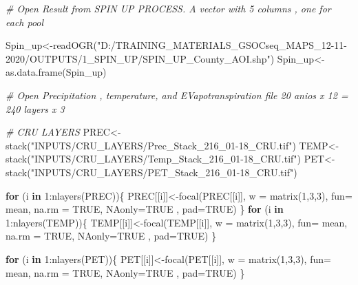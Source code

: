 \documentclass[
  10pt,
  b5paper,
]{book}
\newenvironment{Shaded}{\begin{snugshade}}{\end{snugshade}}
\newcommand{\AttributeTok}[1]{\textcolor[rgb]{0.77,0.63,0.00}{#1}}
\newcommand{\CommentTok}[1]{\textcolor[rgb]{0.56,0.35,0.01}{\textit{#1}}}
\newcommand{\ConstantTok}[1]{\textcolor[rgb]{0.00,0.00,0.00}{#1}}
\newcommand{\ControlFlowTok}[1]{\textcolor[rgb]{0.13,0.29,0.53}{\textbf{#1}}}
\newcommand{\DecValTok}[1]{\textcolor[rgb]{0.00,0.00,0.81}{#1}}
\newcommand{\FunctionTok}[1]{\textcolor[rgb]{0.00,0.00,0.00}{#1}}
\newcommand{\NormalTok}[1]{#1}
\newcommand{\OtherTok}[1]{\textcolor[rgb]{0.56,0.35,0.01}{#1}}
\newcommand{\SpecialCharTok}[1]{\textcolor[rgb]{0.00,0.00,0.00}{#1}}
\newcommand{\StringTok}[1]{\textcolor[rgb]{0.31,0.60,0.02}{#1}}
\begin{document}
\begin{Shaded}
\begin{Highlighting}[]
\CommentTok{\# Open Result from SPIN UP PROCESS. A vector with 5 columns , one for each pool}

\NormalTok{Spin\_up}\OtherTok{\textless{}{-}}\FunctionTok{readOGR}\NormalTok{(}\StringTok{"D:/TRAINING\_MATERIALS\_GSOCseq\_MAPS\_12{-}11{-}2020/OUTPUTS/1\_SPIN\_UP/SPIN\_UP\_County\_AOI.shp"}\NormalTok{)}
\NormalTok{Spin\_up}\OtherTok{\textless{}{-}}\FunctionTok{as.data.frame}\NormalTok{(Spin\_up)}

\CommentTok{\# Open Precipitation , temperature, and EVapotranspiration file 20 anios x 12 = 240 layers x 3}

\CommentTok{\# CRU LAYERS}
\NormalTok{PREC}\OtherTok{\textless{}{-}}\FunctionTok{stack}\NormalTok{(}\StringTok{"INPUTS/CRU\_LAYERS/Prec\_Stack\_216\_01{-}18\_CRU.tif"}\NormalTok{)}
\NormalTok{TEMP}\OtherTok{\textless{}{-}}\FunctionTok{stack}\NormalTok{(}\StringTok{"INPUTS/CRU\_LAYERS/Temp\_Stack\_216\_01{-}18\_CRU.tif"}\NormalTok{)}
\NormalTok{PET}\OtherTok{\textless{}{-}}\FunctionTok{stack}\NormalTok{(}\StringTok{"INPUTS/CRU\_LAYERS/PET\_Stack\_216\_01{-}18\_CRU.tif"}\NormalTok{)}

\ControlFlowTok{for}\NormalTok{ (i }\ControlFlowTok{in} \DecValTok{1}\SpecialCharTok{:}\FunctionTok{nlayers}\NormalTok{(PREC))\{}
\NormalTok{  PREC[[i]]}\OtherTok{\textless{}{-}}\FunctionTok{focal}\NormalTok{(PREC[[i]], }\AttributeTok{w =} \FunctionTok{matrix}\NormalTok{(}\DecValTok{1}\NormalTok{,}\DecValTok{3}\NormalTok{,}\DecValTok{3}\NormalTok{), }\AttributeTok{fun=}\NormalTok{ mean,  }\AttributeTok{na.rm =} \ConstantTok{TRUE}\NormalTok{, }\AttributeTok{NAonly=}\ConstantTok{TRUE}\NormalTok{ , }\AttributeTok{pad=}\ConstantTok{TRUE}\NormalTok{)}
\NormalTok{\}}
\ControlFlowTok{for}\NormalTok{ (i }\ControlFlowTok{in} \DecValTok{1}\SpecialCharTok{:}\FunctionTok{nlayers}\NormalTok{(TEMP))\{}
\NormalTok{  TEMP[[i]]}\OtherTok{\textless{}{-}}\FunctionTok{focal}\NormalTok{(TEMP[[i]], }\AttributeTok{w =} \FunctionTok{matrix}\NormalTok{(}\DecValTok{1}\NormalTok{,}\DecValTok{3}\NormalTok{,}\DecValTok{3}\NormalTok{), }\AttributeTok{fun=}\NormalTok{ mean,  }\AttributeTok{na.rm =} \ConstantTok{TRUE}\NormalTok{, }\AttributeTok{NAonly=}\ConstantTok{TRUE}\NormalTok{ , }\AttributeTok{pad=}\ConstantTok{TRUE}\NormalTok{)}
\NormalTok{\}}

\ControlFlowTok{for}\NormalTok{ (i }\ControlFlowTok{in} \DecValTok{1}\SpecialCharTok{:}\FunctionTok{nlayers}\NormalTok{(PET))\{}
\NormalTok{  PET[[i]]}\OtherTok{\textless{}{-}}\FunctionTok{focal}\NormalTok{(PET[[i]], }\AttributeTok{w =} \FunctionTok{matrix}\NormalTok{(}\DecValTok{1}\NormalTok{,}\DecValTok{3}\NormalTok{,}\DecValTok{3}\NormalTok{), }\AttributeTok{fun=}\NormalTok{ mean,  }\AttributeTok{na.rm =} \ConstantTok{TRUE}\NormalTok{, }\AttributeTok{NAonly=}\ConstantTok{TRUE}\NormalTok{ , }\AttributeTok{pad=}\ConstantTok{TRUE}\NormalTok{)}
\NormalTok{\}}



\end{Highlighting}
\end{Shaded}
\end{document}

